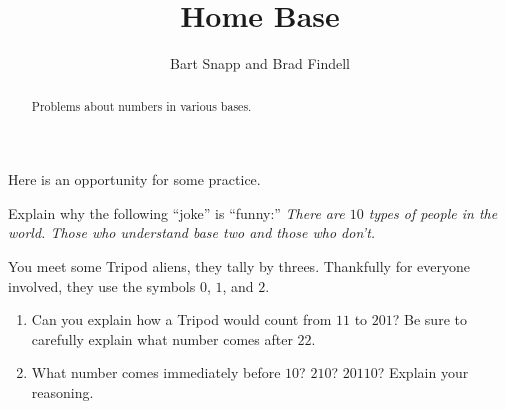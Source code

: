 \documentclass[nooutcomes]{ximera}
\title{Home Base}
\author{Bart Snapp and Brad Findell}
\begin{document}
\begin{abstract}
Problems about numbers in various bases. 
\end{abstract}
\maketitle

%
%
%

Here is an opportunity for some practice. 

\begin{center}
\end{center}

\begin{center}
\end{center}

\begin{center}
\end{center}

\begin{center}
\end{center}


\begin{center}
\end{center}



\begin{problem}Explain why the following ``joke'' is ``funny:'' \textit{There
  are $10$ types of people in the world. Those who understand base two
  and those who don't.}
\end{problem} 

\begin{problem}You meet some Tripod aliens, they tally by threes. Thankfully
  for everyone involved, they use the symbols $0$, $1$, and $2$. 
\begin{enumerate}
\item Can you explain how a Tripod would count from $11$ to $201$? Be
  sure to carefully explain what number comes after $22$.
\item What number comes immediately before $10$?  $210$? $20110$?
  Explain your reasoning.
\end{enumerate}
\end{problem} 
\end{document}
